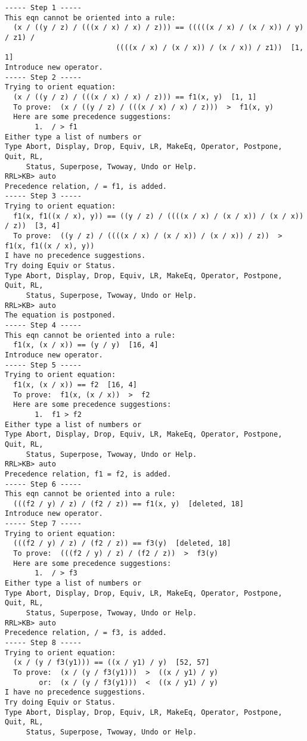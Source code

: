 \begin{verbatim}
----- Step 1 -----
This eqn cannot be oriented into a rule: 
  (x / ((y / z) / (((x / x) / x) / z))) == (((((x / x) / (x / x)) / y) / z1) / 
                          ((((x / x) / (x / x)) / (x / x)) / z1))  [1, 1]
Introduce new operator.
----- Step 2 -----
Trying to orient equation: 
  (x / ((y / z) / (((x / x) / x) / z))) == f1(x, y)  [1, 1]
  To prove:  (x / ((y / z) / (((x / x) / x) / z)))  >  f1(x, y)
  Here are some precedence suggestions:
       1.  / > f1
Either type a list of numbers or
Type Abort, Display, Drop, Equiv, LR, MakeEq, Operator, Postpone, Quit, RL,
     Status, Superpose, Twoway, Undo or Help.
RRL>KB> auto
Precedence relation, / = f1, is added.
----- Step 3 -----
Trying to orient equation: 
  f1(x, f1((x / x), y)) == ((y / z) / ((((x / x) / (x / x)) / (x / x)) / z))  [3, 4]
  To prove:  ((y / z) / ((((x / x) / (x / x)) / (x / x)) / z))  >  f1(x, f1((x / x), y))
I have no precedence suggestions.  
Try doing Equiv or Status.
Type Abort, Display, Drop, Equiv, LR, MakeEq, Operator, Postpone, Quit, RL,
     Status, Superpose, Twoway, Undo or Help.
RRL>KB> auto
The equation is postponed.
----- Step 4 -----
This eqn cannot be oriented into a rule: 
  f1(x, (x / x)) == (y / y)  [16, 4]
Introduce new operator.
----- Step 5 -----
Trying to orient equation: 
  f1(x, (x / x)) == f2  [16, 4]
  To prove:  f1(x, (x / x))  >  f2
  Here are some precedence suggestions:
       1.  f1 > f2
Either type a list of numbers or
Type Abort, Display, Drop, Equiv, LR, MakeEq, Operator, Postpone, Quit, RL,
     Status, Superpose, Twoway, Undo or Help.
RRL>KB> auto
Precedence relation, f1 = f2, is added.
----- Step 6 -----
This eqn cannot be oriented into a rule: 
  (((f2 / y) / z) / (f2 / z)) == f1(x, y)  [deleted, 18]
Introduce new operator.
----- Step 7 -----
Trying to orient equation: 
  (((f2 / y) / z) / (f2 / z)) == f3(y)  [deleted, 18]
  To prove:  (((f2 / y) / z) / (f2 / z))  >  f3(y)
  Here are some precedence suggestions:
       1.  / > f3
Either type a list of numbers or
Type Abort, Display, Drop, Equiv, LR, MakeEq, Operator, Postpone, Quit, RL,
     Status, Superpose, Twoway, Undo or Help.
RRL>KB> auto
Precedence relation, / = f3, is added.
----- Step 8 -----
Trying to orient equation: 
  (x / (y / f3(y1))) == ((x / y1) / y)  [52, 57]
  To prove:  (x / (y / f3(y1)))  >  ((x / y1) / y)
        or:  (x / (y / f3(y1)))  <  ((x / y1) / y)
I have no precedence suggestions.  
Try doing Equiv or Status.
Type Abort, Display, Drop, Equiv, LR, MakeEq, Operator, Postpone, Quit, RL,
     Status, Superpose, Twoway, Undo or Help.

\end{verbatim}
